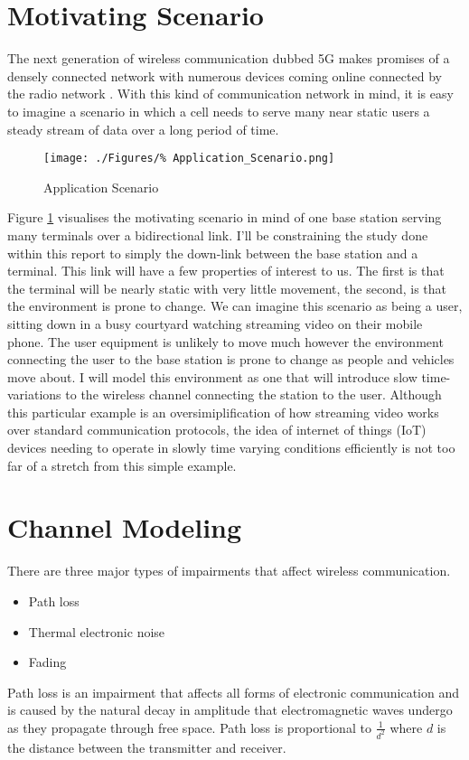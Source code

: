 \section{Motivating Scenario}
\label{sec:MotivatingScenario}
The next generation of wireless communication %
dubbed 5G makes promises of a densely connected %
network with numerous devices coming online %
connected by the radio network \cite{Demestichas13,Hossain15}. %
With this kind of communication network in mind, it is easy %
to imagine a scenario in which a cell needs %
to serve many near static users a steady stream %
of data over a long period of time.%
\begin{figure}[h!]
	\texttt{[image: ./Figures/\%
	Application\_Scenario.png]}
	\caption{Application Scenario}
	\label{fig:AppScene}
\end{figure}
Figure \ref{fig:AppScene} visualises the motivating %
scenario in mind of one base station serving many %
terminals over a bidirectional link. I'll be constraining %
the study done within this report to simply the down-link %
between the base station and a terminal. This link will %
have a few properties of interest to us. The first is that %
the terminal will be nearly static with very little movement, %
the second, is that the environment is prone to change. We can %
imagine this scenario as being a user, sitting down in a busy %
courtyard watching streaming video on their mobile phone. The %
user equipment is unlikely to move much however the environment %
connecting the user to the base station is prone to change as %
people and vehicles move about. I will model this environment %
as one that will introduce slow time-variations to the wireless %
channel connecting the station to the user. Although this %
particular example is an oversimiplification of how streaming %
video works over standard communication protocols, the idea %
of internet of things (IoT) devices needing to operate in %
slowly time varying conditions efficiently is not too far %
of a stretch from this simple example.

\section{Channel Modeling}

There are three major types of impairments that affect %
wireless communication.
\begin{itemize}
	\item{Path loss}
	\item{Thermal electronic noise}
	\item{Fading}
\end{itemize}
Path loss is an impairment that affects %
all forms of electronic communication and is %
caused by the natural decay in amplitude %
that electromagnetic waves undergo as they %
propagate through free space. Path loss %
is proportional to $\frac{1}{d^2}$ where %
$d$ is the distance between the transmitter %
and receiver.

